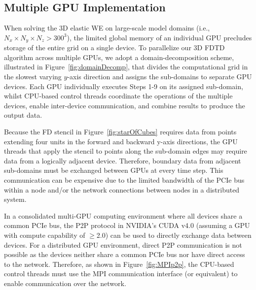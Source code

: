 \subsection{Multiple GPU Implementation}

When solving the 3D elastic WE on large-scale model domains (i.e., $N_x\times N_y \times N_z > 300^3$), the limited global memory of an individual GPU precludes storage of the entire grid on a single device.  To parallelize our 3D FDTD algorithm across multiple GPUs, we adopt a domain-decomposition scheme, illustrated in Figure~\ref{fig:domainDecomp}, that divides the computational grid in the slowest varying $y$-axis direction and assigns the sub-domains to separate GPU devices.  Each GPU individually executes Steps 1-9 on its assigned sub-domain, whilst CPU-based control threads coordinate the operations of the multiple devices, enable inter-device communication, and combine results to produce the output data.


Because the FD stencil in Figure~\ref{fig:starOfCubes} requires data from points extending four units in the forward and backward y-axis directions, the GPU threads that apply the stencil to points along the sub-domain edges may require data from a logically adjacent device.  Therefore, boundary data from adjacent sub-domains must be exchanged between GPUs at every time step.  This communication can be expensive due to the limited bandwidth of the PCIe bus within a node and/or the network connections between nodes in a distributed system.

In a consolidated multi-GPU computing environment where all devices share a common PCIe bus, the P2P protocol in NVIDIA's CUDA v4.0 (assuming a GPU with compute capability of  $\geq$2.0) can be used to directly exchange data between devices.  For a distributed GPU environment, direct P2P communication is not possible as the devices neither share a common PCIe bus nor have direct access to the network.  Therefore, as shown in Figure~\ref{fig:MPIp2p}, the CPU-based control threads must use the MPI communication interface (or equivalent) to enable communication over the network.

